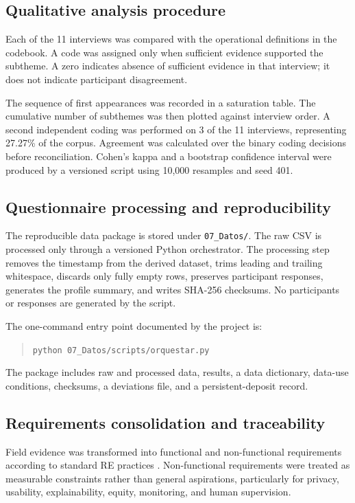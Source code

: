 \documentclass[10pt,a4paper]{article}
\begin{document}
\subsection{Qualitative analysis procedure}
Each of the 11 interviews was compared with the operational definitions in the codebook. A code was assigned only when sufficient evidence supported the subtheme. A zero indicates absence of sufficient evidence in that interview; it does not indicate participant disagreement.

The sequence of first appearances was recorded in a saturation table. The cumulative number of subthemes was then plotted against interview order. A second independent coding was performed on 3 of the 11 interviews, representing 27.27\% of the corpus. Agreement was calculated over the binary coding decisions before reconciliation. Cohen's kappa and a bootstrap confidence interval were produced by a versioned script using 10,000 resamples and seed 401.

\subsection{Questionnaire processing and reproducibility}
The reproducible data package is stored under \texttt{07\_Datos/}. The raw CSV is processed only through a versioned Python orchestrator. The processing step removes the timestamp from the derived dataset, trims leading and trailing whitespace, discards only fully empty rows, preserves participant responses, generates the profile summary, and writes SHA-256 checksums. No participants or responses are generated by the script.

The one-command entry point documented by the project is:

\begin{quote}
\texttt{python 07\_Datos/scripts/orquestar.py}
\end{quote}

The package includes raw and processed data, results, a data dictionary, data-use conditions, checksums, a deviations file, and a persistent-deposit record.

\subsection{Requirements consolidation and traceability}
Field evidence was transformed into functional and non-functional requirements according to standard RE practices \citep{iso29148_2018,pohl2010requirements}. Non-functional requirements were treated as measurable constraints rather than general aspirations, particularly for privacy, usability, explainability, equity, monitoring, and human supervision.
\end{document}

